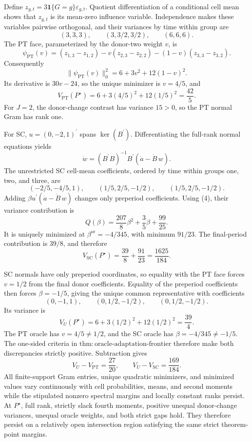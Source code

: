 Define \(z_{g,t}=3\mathbf 1\{G=g\}\varepsilon_{g,t}\).  Quotient differentiation of a conditional cell mean shows that \(z_{g,t}\) is its mean-zero influence variable.  Independence makes these variables pairwise orthogonal, and their variances by time within group are
\[
 (3,3,3),
 \qquad
 (3,3/2,3/2),
 \qquad
 (6,6,6).
 \tag{4}
\]
The PT face, parameterized by the donor-two weight \(v\), is
\[
 \psi_{\mathrm{PT}}(v)=(z_{1,3}-z_{1,2})
 -v(z_{2,3}-z_{2,2})-(1-v)(z_{3,3}-z_{3,2}).
 \tag{5}
\]
Consequently
\[
 \|\psi_{\mathrm{PT}}(v)\|_0^2=6+3v^2+12(1-v)^2.
 \tag{6}
\]
Its derivative is \(30v-24\), so the unique minimizer is \(v=4/5\), and
\[
 V_{\mathrm{PT}}(P^{\star})
 =6+3(4/5)^2+12(1/5)^2=\frac{42}{5}.
 \tag{7}
\]
For \(J=2\), the donor-change contrast has variance \(15>0\), so the PT normal Gram has rank one.

For SC, \(u=(0,-2,1)^{\prime}\) spans \(\ker(B^{\prime})\).  Differentiating the full-rank normal equations yields
\[
 \dot w=(B^{\prime}B)^{-1}B^{\prime}(\dot a-\dot B\,w).
 \tag{8}
\]
The unrestricted SC cell-mean coefficients, ordered by time within groups one, two, and three, are
\[
 (-2/5,-4/5,1),
 \qquad
 (1/5,2/5,-1/2),
 \qquad
 (1/5,2/5,-1/2).
 \tag{9}
\]
Adding \(\beta u^{\prime}(\dot a-\dot B\,w)\) changes only preperiod coefficients.  Using (4), their variance contribution is
\[
 Q(\beta)=\frac{207}{8}\beta^2+\frac35\beta+\frac{99}{25}.
 \tag{10}
\]
It is uniquely minimized at \(\beta^{\mathrm{or}}=-4/345\), with minimum \(91/23\).  The final-period contribution is \(39/8\), and therefore
\[
 V_{\mathrm{SC}}(P^{\star})=\frac{39}{8}+\frac{91}{23}=\frac{1625}{184}.
 \tag{11}
\]

SC normals have only preperiod coordinates, so equality with the PT face forces \(v=1/2\) from the final donor coefficients.  Equality of the preperiod coefficients then forces \(\beta=-1/5\), giving the unique common representative with coefficients
\[
 (0,-1,1),
 \qquad
 (0,1/2,-1/2),
 \qquad
 (0,1/2,-1/2).
 \tag{12}
\]
Its variance is
\[
 V_U(P^{\star})=6+3(1/2)^2+12(1/2)^2=\frac{39}{4}.
 \tag{13}
\]
The PT oracle has \(v=4/5\ne1/2\), and the SC oracle has \(\beta=-4/345\ne-1/5\).  The one-sided criteria in \(\mathrm{thm{:}oracle\text{-}adaptation\text{-}frontier}\) therefore make both discrepancies strictly positive.  Subtraction gives
\[
 V_U-V_{\mathrm{PT}}=\frac{27}{20},
 \qquad
 V_U-V_{\mathrm{SC}}=\frac{169}{184}.
 \tag{14}
\]
All finite-support Gram entries, unique quadratic minimizers, and minimized values vary continuously with cell probabilities, means, and second moments while the stipulated nonzero spectral margins and locally constant ranks persist.  At \(P^{\star}\), full rank, strictly slack fourth moments, positive unequal donor-change variances, unequal oracle weights, and both strict gaps hold.  They therefore persist on a relatively open intersection region satisfying the same strict theorem-point margins.

